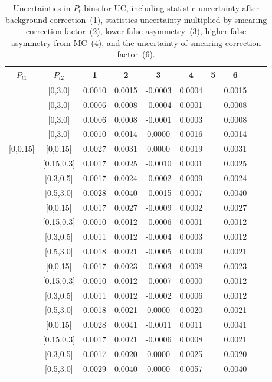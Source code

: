 \begin{table}[H]\scriptsize
\centering
\begin{tabular}{|c| c| c| c| c| c| c| c| c| c|}
\hline
$P_{t1}$ & $P_{t2}$ & 1 & 2 & 3 & 4& 5& 6 \\ \hline
[0,0.15]	&	[0,3.0]	&	0.0010	&	0.0015	&	-0.0003	&	0.0004	&		&	0.0015	\\ \hline
[0.15,0.3]	&	[0,3.0]	&	0.0006	&	0.0008	&	-0.0004	&	0.0001	&		&	0.0008	\\ \hline
[0.3,0.5]	&	[0,3.0]	&	0.0006	&	0.0008	&	-0.0001	&	0.0003	&		&	0.0008	\\ \hline
[0.5,3.0]	&	[0,3.0]	&	0.0010	&	0.0014	&	0.0000	&	0.0016	&		&	0.0014	\\ \hline
															
[0,0.15]	&	[0,0.15]	&	0.0027	&	0.0031	&	0.0000	&	0.0019	&		&	0.0031	\\ \hline
[0,0.15]	&	[0.15,0.3]	&	0.0017	&	0.0025	&	-0.0010	&	0.0001	&		&	0.0025	\\ \hline
[0,0.15]	&	[0.3,0.5]	&	0.0017	&	0.0024	&	-0.0002	&	0.0009	&		&	0.0024	\\ \hline
[0,0.15]	&	[0.5,3.0]	&	0.0028	&	0.0040	&	-0.0015	&	0.0007	&		&	0.0040	\\ \hline
[0.15,0.3]	&	[0,0.15]	&	0.0017	&	0.0027	&	-0.0009	&	0.0002	&		&	0.0027	\\ \hline
[0.15,0.3]	&	[0.15,0.3]	&	0.0010	&	0.0012	&	-0.0006	&	0.0001	&		&	0.0012	\\ \hline
[0.15,0.3]	&	[0.3,0.5]	&	0.0011	&	0.0012	&	-0.0004	&	0.0003	&		&	0.0012	\\ \hline
[0.15,0.3]	&	[0.5,3.0]	&	0.0018	&	0.0021	&	-0.0005	&	0.0009	&		&	0.0021	\\ \hline
[0.3,0.5]	&	[0,0.15]	&	0.0017	&	0.0023	&	-0.0003	&	0.0008	&		&	0.0023	\\ \hline
[0.3,0.5]	&	[0.15,0.3]	&	0.0010	&	0.0012	&	-0.0007	&	0.0000	&		&	0.0012	\\ \hline
[0.3,0.5]	&	[0.3,0.5]	&	0.0011	&	0.0012	&	-0.0002	&	0.0006	&		&	0.0012	\\ \hline
[0.3,0.5]	&	[0.5,3.0]	&	0.0018	&	0.0021	&	0.0000	&	0.0020	&		&	0.0021	\\ \hline
[0.5,3.0]	&	[0,0.15]	&	0.0028	&	0.0041	&	-0.0011	&	0.0011	&		&	0.0041	\\ \hline
[0.5,3.0]	&	[0.15,0.3]	&	0.0017	&	0.0021	&	-0.0006	&	0.0008	&		&	0.0021	\\ \hline
[0.5,3.0]	&	[0.3,0.5]	&	0.0017	&	0.0020	&	0.0000	&	0.0025	&		&	0.0020	\\ \hline
[0.5,3.0]	&	[0.5,3.0]	&	0.0029	&	0.0040	&	0.0000	&	0.0057	&		&	0.0040	\\ \hline
\end{tabular}
\caption{Uncertainties in $P_t$ bins for UC, including statistic uncertainty after background correction~(1), statistics uncertainty multiplied by smearing correction factor~(2), lower false asymmetry~(3), higher false asymmetry from MC~(4), and the uncertainty of smearing correction factor~(6).}
\label{tab:ucerrors_pt}
\end{table}

